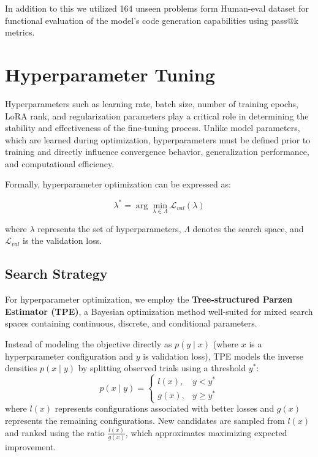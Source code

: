 In addition to this we utilized 164 unseen problems form Human-eval dataset for functional evaluation of the model's code generation capabilities using pass@k metrics.

\section{Hyperparameter Tuning}


Hyperparameters such as learning rate, batch size, number of training epochs, LoRA rank, and regularization parameters play a critical role in determining the stability and effectiveness of the fine-tuning process. Unlike model parameters, which are learned during optimization, hyperparameters must be defined prior to training and directly influence convergence behavior, generalization performance, and computational efficiency.

Formally, hyperparameter optimization can be expressed as:

\begin{equation}
\lambda^* = \arg\min_{\lambda \in \Lambda} \mathcal{L}_{val}(\lambda)
\end{equation}

where $\lambda$ represents the set of hyperparameters, $\Lambda$ denotes the search space, and $\mathcal{L}_{val}$ is the validation loss.

\subsection{Search Strategy}

For hyperparameter optimization, we employ the \textbf{Tree-structured Parzen Estimator (TPE)}, a Bayesian optimization method well-suited for mixed search spaces containing continuous, discrete, and conditional parameters.

Instead of modeling the objective directly as $p(y \mid x)$ (where $x$ is a hyperparameter configuration and $y$ is validation loss), TPE models the inverse densities $p(x \mid y)$ by splitting observed trials using a threshold $y^*$:
\begin{equation}
p(x \mid y) =
\begin{cases}
l(x), & y < y^* \\
g(x), & y \ge y^*
\end{cases}
\end{equation}
where $l(x)$ represents configurations associated with better losses and $g(x)$ represents the remaining configurations. New candidates are sampled from $l(x)$ and ranked using the ratio $\frac{l(x)}{g(x)}$, which approximates maximizing expected improvement.

